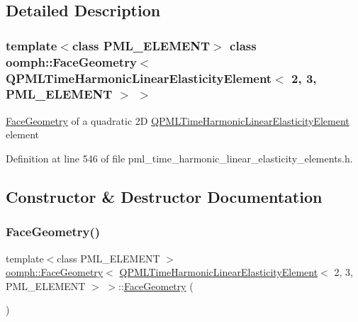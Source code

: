 \subsection{Detailed Description}
\subsubsection*{template$<$class P\+M\+L\+\_\+\+E\+L\+E\+M\+E\+NT$>$\newline
class oomph\+::\+Face\+Geometry$<$ Q\+P\+M\+L\+Time\+Harmonic\+Linear\+Elasticity\+Element$<$ 2, 3, P\+M\+L\+\_\+\+E\+L\+E\+M\+E\+N\+T $>$ $>$}

\hyperlink{classoomph_1_1FaceGeometry}{Face\+Geometry} of a quadratic 2D \hyperlink{classoomph_1_1QPMLTimeHarmonicLinearElasticityElement}{Q\+P\+M\+L\+Time\+Harmonic\+Linear\+Elasticity\+Element} element 

Definition at line 546 of file pml\+\_\+time\+\_\+harmonic\+\_\+linear\+\_\+elasticity\+\_\+elements.\+h.



\subsection{Constructor \& Destructor Documentation}
\mbox{\label{classoomph_1_1FaceGeometry_3_01QPMLTimeHarmonicLinearElasticityElement_3_012_00_013_00_01PML__ELEMENT_01_4_01_4_a7ebd108fe04847504ad0f475afb060f0}} 
\subsubsection{\texorpdfstring{Face\+Geometry()}{FaceGeometry()}}
{\footnotesize\ttfamily template$<$class P\+M\+L\+\_\+\+E\+L\+E\+M\+E\+NT $>$ \\
\hyperlink{classoomph_1_1FaceGeometry}{oomph\+::\+Face\+Geometry}$<$ \hyperlink{classoomph_1_1QPMLTimeHarmonicLinearElasticityElement}{Q\+P\+M\+L\+Time\+Harmonic\+Linear\+Elasticity\+Element}$<$ 2, 3, P\+M\+L\+\_\+\+E\+L\+E\+M\+E\+NT $>$ $>$\+::\hyperlink{classoomph_1_1FaceGeometry}{Face\+Geometry} (\begin{DoxyParamCaption}{ }\end{DoxyParamCaption})\hspace{0.3cm}{\ttfamily [inline]}}



